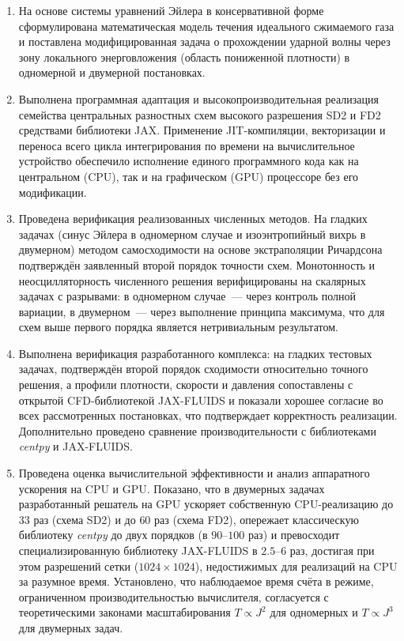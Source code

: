 \documentclass[a4paper,14pt]{extarticle}
\theoremstyle{theorem}
\theoremstyle{lemma}
\begin{document}
\begin{enumerate}
    \item На основе системы уравнений Эйлера в консервативной форме сформулирована
    математическая модель течения идеального сжимаемого газа и поставлена
    модифицированная задача о прохождении ударной волны через зону локального
    энерговложения (область пониженной плотности) в одномерной и двумерной
    постановках.

    \item Выполнена программная адаптация и высокопроизводительная реализация
    семейства центральных разностных схем высокого разрешения SD2 и FD2 средствами
    библиотеки JAX. Применение JIT-компиляции, векторизации и переноса всего цикла
    интегрирования по времени на вычислительное устройство обеспечило исполнение
    единого программного кода как на центральном (CPU), так и на графическом (GPU)
    процессоре без его модификации.

    \item Проведена верификация реализованных численных методов. На гладких задачах
    (синус Эйлера в одномерном случае и изоэнтропийный вихрь в двумерном) методом
    самосходимости на основе экстраполяции Ричардсона подтверждён заявленный второй
    порядок точности схем. Монотонность и неосцилляторность численного решения
    верифицированы на скалярных задачах с разрывами: в одномерном случае~--- через
    контроль полной вариации, в двумерном~--- через выполнение принципа максимума,
    что для схем выше первого порядка является нетривиальным результатом.

    \item Выполнена верификация разработанного комплекса: на гладких тестовых
    задачах, подтверждён второй порядок сходимости относительно точного решения,
    а профили плотности, скорости и давления сопоставлены с открытой
    CFD-библиотекой JAX-FLUIDS и показали хорошее согласие во всех рассмотренных
    постановках, что подтверждает корректность реализации. Дополнительно
    проведено сравнение производительности с библиотеками \textit{centpy} и JAX-FLUIDS.

    \item Проведена оценка вычислительной эффективности и анализ аппаратного
    ускорения на CPU и GPU. Показано, что в двумерных задачах разработанный решатель
    на GPU ускоряет собственную CPU-реализацию до $33$ раз (схема SD2) и до $60$ раз
    (схема FD2), опережает классическую библиотеку \textit{centpy} до двух порядков
    (в $90$--$100$ раз) и превосходит специализированную библиотеку JAX-FLUIDS в
    $2.5$--$6$ раз, достигая при этом разрешений сетки ($1024 \times 1024$),
    недостижимых для реализаций на CPU за разумное время. Установлено, что
    наблюдаемое время счёта в режиме, ограниченном производительностью вычислителя,
    согласуется с теоретическими законами масштабирования $T \propto J^2$ для
    одномерных и $T \propto J^3$ для двумерных задач.


\end{enumerate}
\end{document}
